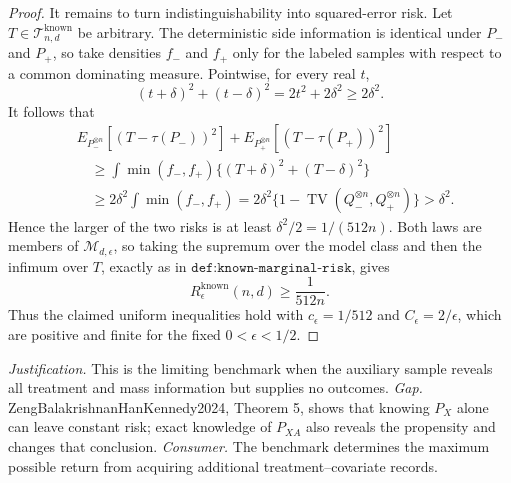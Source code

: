 \documentclass{article}
\begin{document}
\begin{proof}
It remains to turn indistinguishability into squared-error risk.  Let \(T\in\mathcal T^{\mathrm{known}}_{n,d}\) be arbitrary.  The deterministic side information is identical under \(P_-\) and \(P_+\), so take densities \(f_-\) and \(f_+\) only for the labeled samples with respect to a common dominating measure.  Pointwise, for every real \(t\),
\[
(t+\delta)^2+(t-\delta)^2=2t^2+2\delta^2\geq2\delta^2.
\]
It follows that
\[
\begin{aligned}
&E_{P_-^{\otimes n}}[(T-\tau(P_-))^2]
 +E_{P_+^{\otimes n}}[(T-\tau(P_+))^2]\\
&\quad\geq
\int \min(f_-,f_+)
\bigl\{(T+\delta)^2+(T-\delta)^2\bigr\}\\
&\quad\geq2\delta^2\int\min(f_-,f_+)
=2\delta^2\{1-\operatorname{TV}(Q_-^{\otimes n},Q_+^{\otimes n})\}
>\delta^2.
\end{aligned}
\]
Hence the larger of the two risks is at least \(\delta^2/2=1/(512n)\).  Both laws are members of \(\mathcal M_{d,\epsilon}\), so taking the supremum over the model class and then the infimum over \(T\), exactly as in \(\texttt{def:known-marginal-risk}\), gives
\[
R_\epsilon^{\mathrm{known}}(n,d)\geq\frac{1}{512n}.
\]
Thus the claimed uniform inequalities hold with \(c_\epsilon=1/512\) and \(C_\epsilon=2/\epsilon\), which are positive and finite for the fixed \(0<\epsilon<1/2\).
\end{proof}
\par\smallskip\noindent \textit{Justification.} This is the limiting benchmark when the auxiliary sample reveals all treatment and mass information but supplies no outcomes. \textit{Gap.} ZengBalakrishnanHanKennedy2024, Theorem 5, shows that knowing \(P_X\) alone can leave constant risk; exact knowledge of \(P_{XA}\) also reveals the propensity and changes that conclusion. \textit{Consumer.} The benchmark determines the maximum possible return from acquiring additional treatment--covariate records.
\end{document}
